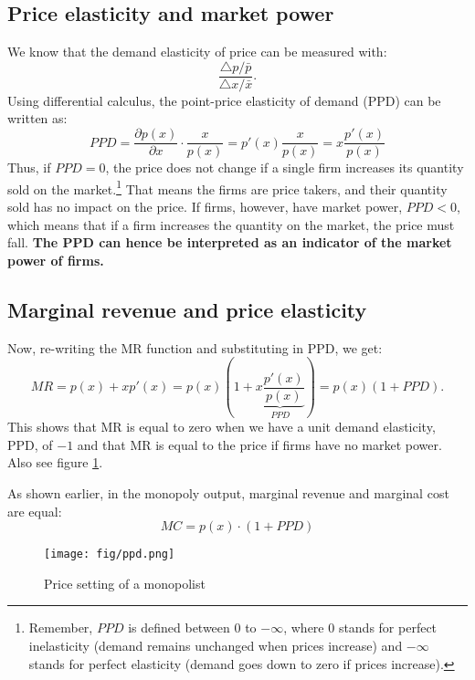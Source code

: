 
\subsection{Price elasticity and market power}\label{price-elasticity-and-market-power} 

We know that the demand elasticity of price can be measured with:
\[ \frac{\triangle p/\bar{p}}{\triangle x / \bar{x}}. \]
Using differential calculus, the point-price elasticity of demand (PPD) can be written as:
\[ PPD = \frac{\partial p(x)}{\partial x} \cdot \frac{x}{p(x)} = p'(x) \frac{x}{p(x)} = x \frac{p'(x)}{p(x)} \]
Thus, if \(PPD = 0\), the price does not change if a single firm increases its quantity sold on the market.\footnote{Remember, $PPD$ is defined between 0 to $-\infty$, where 0 stands for perfect inelasticity (demand remains unchanged when prices increase) and $-\infty$ stands for perfect elasticity (demand goes down to zero if prices increase).} That means the firms are price takers, and their quantity sold has no impact on the price. If firms, however, have market power, \(PPD < 0\), which means that if a firm increases the quantity on the market, the price must fall. \textbf{The PPD can hence be interpreted as an indicator of the market power of firms.}

\subsection{Marginal revenue and price elasticity}\label{marginal-revenue-and-price-elasticity} 

Now, re-writing the MR function and substituting in PPD, we get:
\[ MR = p(x) + xp'(x) = p(x)\left(1 + \underbrace{x\frac{p'(x)}{p(x)}}_{PPD}\right)  = p(x)\left(1 + PPD\right). \]
This shows that MR is equal to zero when we have a unit demand elasticity, PPD, of \(-1\) and that MR is equal to the price if firms have no market power. Also see figure \ref{fig:ppd}. 

As shown earlier, in the monopoly output, marginal revenue and marginal cost are equal:
\begin{equation}
	MC = p(x) \cdot \left(1 + PPD\right)\label{eq:ppd}
\end{equation}
\begin{figure}
	\centering
	\texttt{[image: fig/ppd.png]}
	\caption{Price setting of a monopolist}\label{fig:ppd}
\end{figure}

